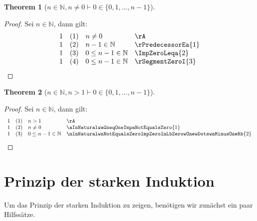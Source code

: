\documentclass{book}
\theoremstyle{plain}
\newtheorem{theorem}{Theorem}
\theoremstyle{remark}
\theoremstyle{definition}
\begin{document}
\label{nInNaturalwnNotEqualsZeroImpZeroInLbZerowOnewDotswnMinusOneRb}
\begin{theorem}[\(n\in\mathbb{N},n\neq 0\vdash 0\in\{0, 1, \dots, n-1\}\)]
\end{theorem}
\begin{proof}
Sei \(n\in\mathbb{N}\), dann gilt:
        \[
	\begin{array}{llll}
            1       &  (1) & n\neq 0 & \rA \\
            1       &  (2) & n-1\in\mathbb{N} & \rPredecessorEa{1} \\
            1       &  (3) & 0\leq n-1\in\mathbb{N} & \ImpZeroLeqa{2} \\
            1       &  (4) & 0\leq n-1\in\mathbb{N} & \rSegmentZeroI{3} \\
        \end{array}
	\]
\end{proof}

\label{nInNaturalwnGneqOneImpZeroInLbZerowOnewDotswnMinusOneRb}
\begin{theorem}[\(n\in\mathbb{N},n>1\vdash 0\in\{0, 1, \dots, n-1\}\)]
\end{theorem}
\begin{proof}
Sei \(n\in\mathbb{N}\), dann gilt:
        \[
	\begin{array}{llll}
            1       &  (1) & n>1 & \rA \\
            1       &  (2) & n\neq 0 & \aInNaturalwaGneqOneImpaNotEqualsZero{1} \\
            1       &  (3) & 0\leq n-1\in\mathbb{N} & \nInNaturalwnNotEqualsZeroImpZeroInLbZerowOnewDotswnMinusOneRb{2} \\
        \end{array}
	\]
\end{proof}


\section{Prinzip der starken Induktion}

Um das Prinzip der starken Induktion zu zeigen, benötigen wir zunächst ein paar Hilfssätze.
\end{document}

